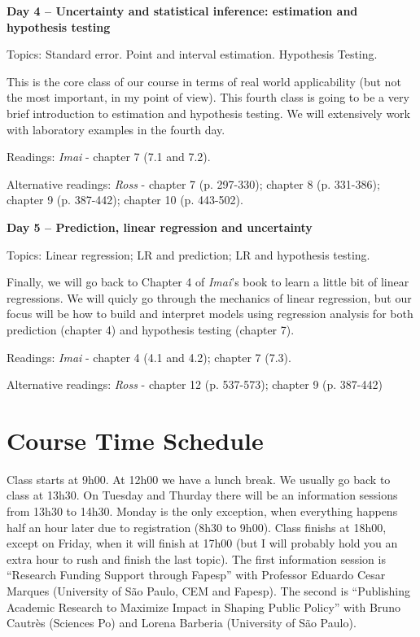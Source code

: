 \documentclass[a4paper,11pt]{article}
\begin{document}
\textbf{Day 4 -- Uncertainty and statistical inference: estimation and hypothesis testing}

Topics: Standard error. Point and interval estimation. Hypothesis Testing.

This is the core class of our course in terms of real world applicability (but not the most important, in my point of view). This fourth class is going to be a very brief introduction to estimation and hypothesis testing. We will extensively work with laboratory examples in the fourth day.

Readings: \emph{Imai} - chapter 7 (7.1 and 7.2).

Alternative readings: \emph{Ross} - chapter 7 (p. 297-330); chapter 8 (p. 331-386); chapter 9 (p. 387-442); chapter 10 (p. 443-502).

\textbf{Day 5 -- Prediction, linear regression and uncertainty}

Topics: Linear regression; LR and prediction; LR and hypothesis testing.

Finally, we will go back to Chapter 4 of \emph{Imai}'s book to learn a little bit of linear regressions. We will quicly go through the mechanics of linear regression, but our focus will be how to build and interpret models using regression analysis for both prediction (chapter 4) and hypothesis testing (chapter 7). 

Readings: \emph{Imai} - chapter 4 (4.1 and 4.2); chapter 7 (7.3).

Alternative readings: \emph{Ross} - chapter 12 (p. 537-573); chapter 9 (p. 387-442)

\section{Course Time Schedule}

Class starts at 9h00. At 12h00 we have a lunch break. We usually go back to class at 13h30. On Tuesday and Thurday there will be an information sessions from 13h30 to 14h30. Monday is the only exception, when everything happens half an hour later due to registration (8h30 to 9h00). Class finishs at 18h00, except on Friday, when it will finish at 17h00 (but I will probably hold you an extra hour to rush and finish the last topic). The first information session is ``Research Funding Support through Fapesp'' with Professor Eduardo Cesar Marques (University of São Paulo, CEM and Fapesp). The second is ``Publishing Academic Research to Maximize Impact in Shaping Public Policy'' with  Bruno Cautrès (Sciences Po) and Lorena Barberia (University of São Paulo).
\end{document}
